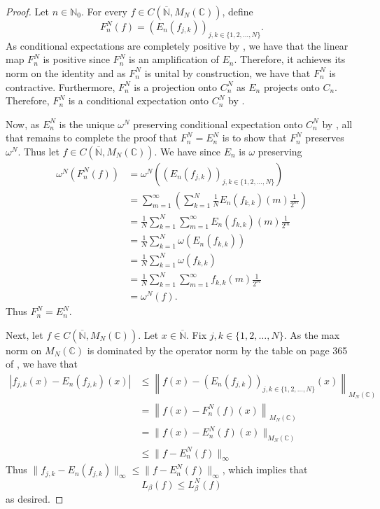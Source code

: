 \documentclass{amsart}
\theoremstyle{plain}
\theoremstyle{definition}
\theoremstyle{remark}
\numberwithin{equation}{section}
\newcommand{\be}{{\beta}}
\newcommand{\om}{{\omega}}
\newcommand{\N}{{\mathds{N}}}
\newcommand{\C}{{\mathds{C}}}
\renewcommand{\leq}{\leqslant}
\begin{document}
\begin{proof}
    Let $n\in \N_0$. For every $f\in C(\overline{\N}, M_N(\C)) $, define
    \[
    F^N_n(f)=(E_n(f_{j,k}))_{j,k\in \{1,2,\ldots, N\}}.
    \]
    As conditional expectations are completely positive by \cite[Tomiyama's Theorem]{Brown-Ozawa}, we have that the linear map $F^N_n$ is positive since $F_n^N$ is an amplification of $E_n$. Therefore, it achieves its norm on the identity and as $F_n^N$ is unital by construction, we have that $F^N_n$ is contractive. Furthermore, $F^N_n$ is a projection onto $C_n^N$ as  $E_n$ projects onto $C_n$. Therefore, $F_n^N$ is a conditional expectation onto $C_n^N$ by \cite[Tomiyama's Theorem]{Brown-Ozawa}. 

    Now, as $E_n^N$ is the unique $\om^N$ preserving conditional expectation onto $C_n^N$ by \cite[Theorem 3.5]{Aguilar-Latremoliere15}, all that remains to complete the proof that $F^N_n=E_n^N$ is to show that $F_n^N$ preserves $\om^N$. Thus let $f\in C(\overline{\N}, M_N(\C))$. We have since $E_n$ is $\om$ preserving
    \begin{align*}
        \om^N(F_n^N(f))& = \om^N((E_n(f_{j,k}))_{j,k\in \{1,2,\ldots, N\}})\\
        & = \sum_{m=1}^\infty\left( \sum_{k=1}^N \frac{1}{N}E_n(f_{k,k})(m)\frac{1}{2^m}\right)\\
        & = \frac{1}{N}\sum_{k=1}^N \sum_{m=1}^\infty E_n(f_{k,k})(m)\frac{1}{2^m}\\
        & = \frac{1}{N}\sum_{k=1}^N \om(E_n(f_{k,k}))\\
        & = \frac{1}{N}\sum_{k=1}^N \om(f_{k,k})\\
        & = \frac{1}{N}\sum_{k=1}^N \sum_{m=1}^\infty f_{k,k}(m)\frac{1}{2^m}\\
        & = \om^N(f).
    \end{align*}
      Thus $F^N_n=E_n^N$.


Next, let $f\in C(\overline{\N}, M_N(\C))$.  Let  $x\in \overline{\N}.$ Fix $j,k\in \{1,2,\ldots, N\}$. As the max norm on $M_N(\C)$ is dominated by the operator norm by the table on page 365 of \cite{Horn}, we have that
\begin{align*}
    \left|f_{j,k}(x)-E_n(f_{j,k})(x)\right| & \leq \left\|f(x)-(E_n(f_{j,k}))_{j,k\in \{1,2,\ldots, N\}}(x)\right\|_{M_N(\C)}\\
    &= \left\|f(x)-F_n^N(f)(x)\right\|_{M_N(\C)}\\
    & = \|f(x)-E_n^N(f)(x)\|_{M_N(\C)}\\
   &  \leq \|f-E_n^N(f)\|_\infty
\end{align*}
Thus $   \|f_{j,k} -E_n(f_{j,k})\|_\infty \leq    \|f-E_n^N(f)\|_\infty $, which implies that
\[
L_\be(f)\leq L_\be^N(f)
\]
as desired.
\end{proof}
\end{document}

